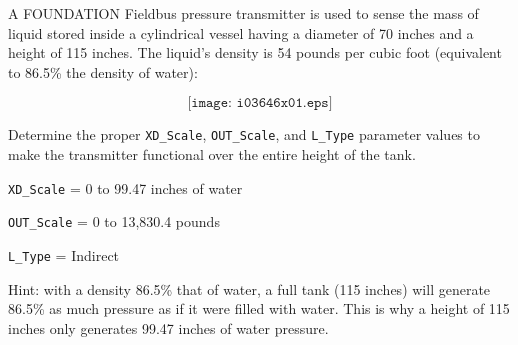 

A FOUNDATION Fieldbus pressure transmitter is used to sense the mass of liquid stored inside a cylindrical vessel having a diameter of 70 inches and a height of 115 inches.  The liquid's density is 54 pounds per cubic foot (equivalent to 86.5\% the density of water):

$$\texttt{[image: i03646x01.eps]}$$

Determine the proper {\tt XD\_Scale}, {\tt OUT\_Scale}, and {\tt L\_Type} parameter values to make the transmitter functional over the entire height of the tank.







{\tt XD\_Scale} = 0 to 99.47 inches of water

\vskip 10pt

{\tt OUT\_Scale} = 0 to 13,830.4 pounds

\vskip 10pt

{\tt L\_Type} = Indirect

\vskip 10pt

Hint: with a density 86.5\% that of water, a full tank (115 inches) will generate 86.5\% as much pressure as if it were filled with water.  This is why a height of 115 inches only generates 99.47 inches of water pressure.











